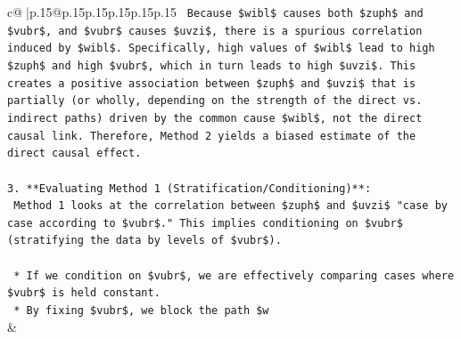 \documentclass{article}
\begin{document}
{\begin{supertabular}{c@{$\;$}|p{.15\linewidth}@{}p{.15\linewidth}p{.15\linewidth}p{.15\linewidth}p{.15\linewidth}p{.15\linewidth}}
{{{\texttt{    Because \$wibl\$ causes both \$zuph\$ and \$vubr\$, and \$vubr\$ causes \$uvzi\$, there is a spurious correlation induced by \$wibl\$. Specifically, high values of \$wibl\$ lead to high \$zuph\$ and high \$vubr\$, which in turn leads to high \$uvzi\$. This creates a positive association between \$zuph\$ and \$uvzi\$ that is partially (or wholly, depending on the strength of the direct vs. indirect paths) driven by the common cause \$wibl\$, not the direct causal link. Therefore, Method 2 yields a biased estimate of the direct causal effect.} \\
\\ 
\texttt{3.  **Evaluating Method 1 (Stratification/Conditioning)**:} \\
\texttt{    Method 1 looks at the correlation between \$zuph\$ and \$uvzi\$ "case by case according to \$vubr\$." This implies conditioning on \$vubr\$ (stratifying the data by levels of \$vubr\$).} \\
\\ 
\texttt{    *   If we condition on \$vubr\$, we are effectively comparing cases where \$vubr\$ is held constant.} \\
\texttt{    *   By fixing \$vubr\$, we block the path \$w} \\
            }
        }
    }
    & \\ \\


\end{supertabular}}
\end{document}
